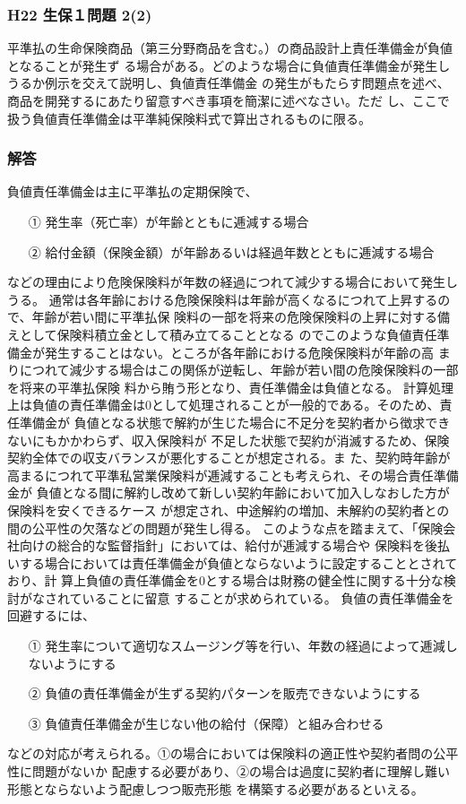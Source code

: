 \documentclass[report,gutter=10mm,fore-edge=10mm,uplatex,dvipdfmx]{jlreq}
\begin{document}
\subsubsection{H22 生保１問題 2(2)}
平準払の生命保険商品（第三分野商品を含む。）の商品設計上責任準備金が負値となることが発生ず
る場合がある。どのような場合に負値責任準備金が発生しうるか例示を交えて説明し、負値責任準備金
の発生がもたらす問題点を述べ、商品を開発するにあたり留意すべき事項を簡潔に述べなさい。ただ
し、ここで扱う負値責任準備金は平準純保険料式で算出されるものに限る。
\subsubsection{解答}
負値責任準備金は主に平準払の定期保険で、
\begin{itemize}
 \item [①]発生率（死亡率）が年齢とともに逓減する場合
 \item [②]給付金額（保険金額）が年齢あるいは経過年数とともに逓減する場合
\end{itemize}
などの理由により危険保険料が年数の経過につれて減少する場合において発生しうる。
通常は各年齢における危険保険料は年齢が高くなるにつれて上昇するので、年齢が若い間に平準払保
険料の一部を将来の危険保険料の上昇に対する備えとして保険料積立金として積み立てることとなる
のでこのような負値責任準備金が発生することはない。ところが各年齢における危険保険料が年齢の高
まりにつれて減少する場合はこの関係が逆転し、年齢が若い間の危険保険料の一部を将来の平準払保険
料から賄う形となり、責任準備金は負値となる。
計算処理上は負値の責任準備金は0として処理されることが一般的である。そのため、責任準備金が
負値となる状態で解約が生じた場合に不足分を契約者から徴求できないにもかかわらず、収入保険料が
不足した状態で契約が消滅するため、保険契約全体での収支バランスが悪化することが想定される。ま
た、契約時年齢が高まるにつれて平準私営業保険料が逓減することも考えられ、その場合責任準備金が
負値となる間に解約し改めて新しい契約年齢において加入しなおした方が保険料を安くできるケース
が想定され、中途解約の増加、未解約の契約者との間の公平性の欠落などの問題が発生し得る。
このような点を踏まえて、「保険会社向けの総合的な監督指針」においては、給付が逓減する場合や
保険料を後払いする場合においては責任準備金が負値とならないように設定することとされており、計
算上負値の責任準備金を0とする場合は財務の健全性に関する十分な検討がなされていることに留意
することが求められている。
負値の責任準備金を回避するには、
\begin{itemize}
 \item [①]発生率について適切なスムージング等を行い、年数の経過によって逓減しないようにする
 \item [②]負値の責任準備金が生ずる契約パターンを販売できないようにする
 \item [③]負値責任準備金が生じない他の給付（保障）と組み合わせる
\end{itemize}
などの対応が考えられる。①の場合においては保険料の適正性や契約者問の公平性に問題がないか
配慮する必要があり、②の場合は過度に契約者に理解し難い形態とならないよう配慮しつつ販売形態
を構築する必要があるといえる。
\end{document}
